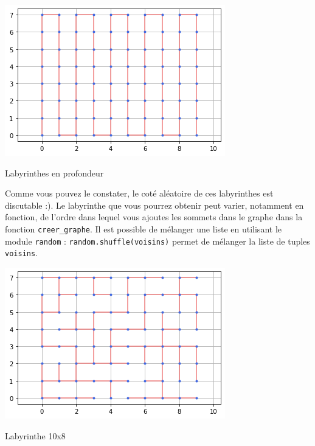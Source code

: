 






\begin{marginfigure}
\includegraphics[width=\linewidth]{grille_10_8_profondeur.png}
\caption{Labyrinthes en profondeur}
\end{marginfigure}

Comme vous pouvez le constater, le coté aléatoire de ces labyrinthes est discutable :). Le labyrinthe que vous pourrez obtenir peut varier, notamment en fonction, de l'ordre dans lequel vous ajoutes les sommets dans le graphe dans la fonction \lstinline{creer_graphe}. 
Il est possible de mélanger une liste en utilisant le module \lstinline{random} : \lstinline{random.shuffle(voisins)} permet de mélanger la liste de tuples \lstinline{voisins}.

\begin{marginfigure}
\includegraphics[width=\linewidth]{labyrinthe_10_8_profondeur.png}
\caption{Labyrinthe 10x8}
\end{marginfigure}


